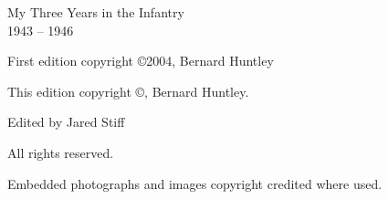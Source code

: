 
\pagestyle{empty}
\vspace*{\fill}
\begin{center}
\HUGE My Three Years in the Infantry\\ \Large 1943 -- 1946
\end{center}
\vspace*{\fill}

\clearpage
\pagestyle{empty}
\mbox{}
\thispagestyle{empty}

\maketitle
\thispagestyle{empty}
\clearpage

\begingroup
\footnotesize\raggedright
\mbox{}
\vfill
\thispagestyle{empty}
\begin{minipage}[b]{0.9\textwidth}
\setlength{\parskip}{0.5\baselineskip}
First edition copyright \copyright 2004, Bernard Huntley\par
This edition copyright \copyright \the\year , Bernard Huntley.\par
Edited by Jared Stiff\par
\vspace*{2\baselineskip}

All rights reserved.\par
\vspace*{2\baselineskip}

Embedded photographs and images copyright credited where used.

\end{minipage}
\vspace*{2\baselineskip}
\vfill
{}
\endgroup
\clearpage
